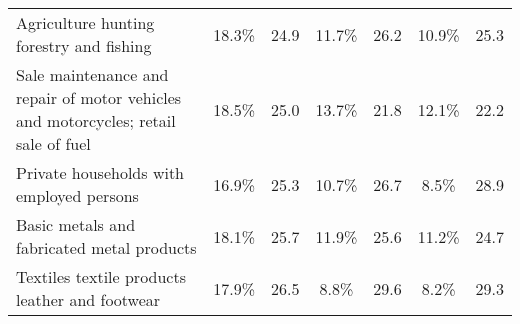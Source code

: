 \documentclass[10pt]{article}
\begin{document}
\begin{table}[!h]
{\begin{tabular}{l|cc|cc|cc}
\rowcolor[HTML]{FFFFFF} 
{\color[HTML]{333333} Agriculture hunting forestry and fishing}                                           & {\color[HTML]{333333} 18.3\%}                                             & {\color[HTML]{333333} 24.9}                                          & {\color[HTML]{333333} 11.7\%}                                             & {\color[HTML]{333333} 26.2}                                          & {\color[HTML]{333333} 10.9\%}                                             & {\color[HTML]{333333} 25.3}                                          \\
\rowcolor[HTML]{FFFFFF} 
{\color[HTML]{333333} Sale maintenance and repair of motor vehicles and motorcycles; retail sale of fuel} & {\color[HTML]{333333} 18.5\%}                                             & {\color[HTML]{333333} 25.0}                                          & {\color[HTML]{333333} 13.7\%}                                             & {\color[HTML]{333333} 21.8}                                          & {\color[HTML]{333333} 12.1\%}                                             & {\color[HTML]{333333} 22.2}                                          \\
\rowcolor[HTML]{FFFFFF} 
{\color[HTML]{333333} Private households with employed persons}                                           & {\color[HTML]{333333} 16.9\%}                                             & {\color[HTML]{333333} 25.3}                                          & {\color[HTML]{333333} 10.7\%}                                             & {\color[HTML]{333333} 26.7}                                          & {\color[HTML]{333333} 8.5\%}                                              & {\color[HTML]{333333} 28.9}                                          \\
\rowcolor[HTML]{FFFFFF} 
{\color[HTML]{333333} Basic metals and fabricated metal products}                                         & {\color[HTML]{333333} 18.1\%}                                             & {\color[HTML]{333333} 25.7}                                          & {\color[HTML]{333333} 11.9\%}                                             & {\color[HTML]{333333} 25.6}                                          & {\color[HTML]{333333} 11.2\%}                                             & {\color[HTML]{333333} 24.7}                                          \\
\rowcolor[HTML]{FFFFFF} 
{\color[HTML]{333333} Textiles textile products leather and footwear}                                     & {\color[HTML]{333333} 17.9\%}                                             & {\color[HTML]{333333} 26.5}                                          & {\color[HTML]{333333} 8.8\%}                                              & {\color[HTML]{333333} 29.6}                                          & {\color[HTML]{333333} 8.2\%}                                              & {\color[HTML]{333333} 29.3}                                          \\

\end{tabular}}
\end{table}
\end{document}
